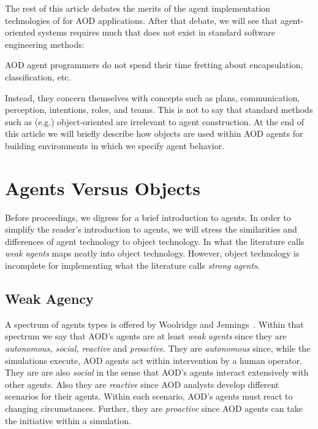 The rest of this article debates the merits of the agent
implementation technologies of  for AOD applications.
After that debate, we will see that agent-oriented systems
requires much that does not exist in standard software engineering
methods: \bi \item
 AOD agent programmers do not spend their time
fretting about encapsulation, classification, etc. \item
 Instead,
they concern themselves with concepts such as plans,
communication, perception, intentions, roles, and teams. \ei
This
is not to say that standard methods such as (e.g.) object-oriented
are irrelevant to agent construction. At the end of this article
we will briefly describe how objects are used within AOD agents
for building environments in which we specify agent behavior.



\section{Agents Versus
Objects}

Before proceedings,   we digress for a brief introduction to agents. In order
to simplify the reader's introduction to agents, we will stress the
similarities and differences of agent technology to object technology. In what
the literature calls  {\em  weak agents} maps neatly into object technology.
However, object technology is incomplete for implementing what the literature
calls {\em strong agents}.



\subsection{Weak Agency}\label{sec:wa}

A spectrum of agents types is  offered by Woolridge and
Jennings~\cite{woolridge95}. Within that spectrum we say that AOD's agents are
at least {\em weak agents} since they are {\em autonomous, social, reactive}
and {\em proactive}. They are {\em autonomous} since, while the  simulations
execute, AOD  agents act within intervention by a human operator.  They are are
also {\em social} in the sense that  AOD's agents interact extensively with
other agents. Also they are  {\em reactive} since AOD analysts develop
different scenarios for their agents. Within each scenario, AOD's agents must
react to changing circumstances. Further, they are {\em proactive} since AOD
agents can take the initiative within a simulation.

